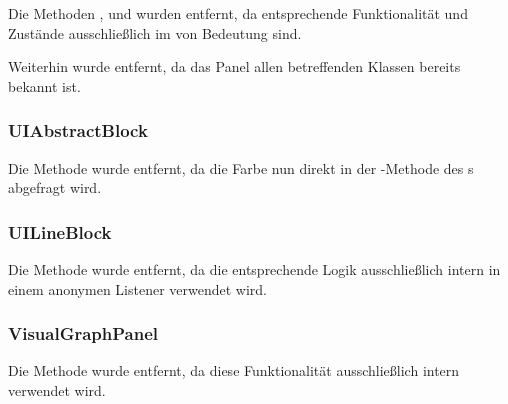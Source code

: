 Die Methoden ,  und  wurden entfernt, da entsprechende Funktionalität und Zustände ausschließlich im  von Bedeutung sind.

Weiterhin wurde  entfernt, da das Panel allen betreffenden Klassen bereits bekannt ist.

\subsubsection{UIAbstractBlock}

Die Methode  wurde entfernt, da die Farbe nun direkt in der -Methode des s abgefragt wird.

\subsubsection{UILineBlock}

Die Methode  wurde entfernt, da die entsprechende Logik ausschließlich intern in einem anonymen Listener verwendet wird.


\subsubsection{VisualGraphPanel}

Die Methode  wurde entfernt, da diese Funktionalität ausschließlich intern verwendet wird.
